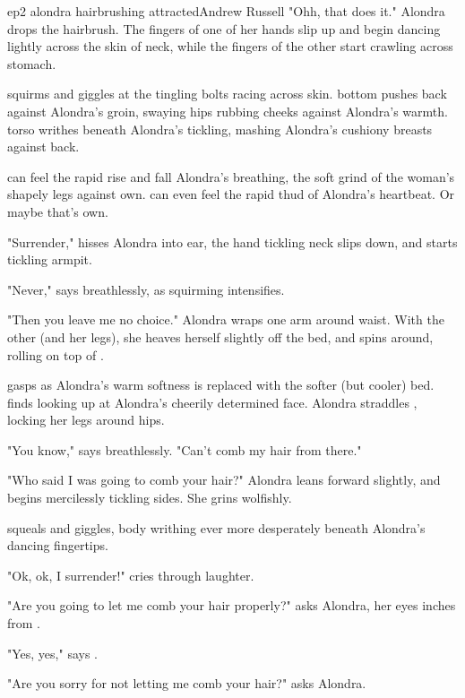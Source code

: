 \documentclass{book}
\begin{document}
\begin{childnode}{ep2 alondra hairbrushing attracted}{Andrew Russell}
    "Ohh, that does it." Alondra drops the hairbrush. The fingers of one of her hands slip up and begin dancing lightly across the skin of \names{} neck, while the fingers of the other start crawling 
    across \names{} stomach. 

    \name{} squirms and giggles at the tingling bolts racing across \hisher{} skin. \HisHer{} \muscleadj{} bottom pushes back against Alondra's groin, \hisher{} swaying hips rubbing \hisher{} 
    \bumadj{} cheeks against Alondra's warmth. \HisHer{} torso writhes beneath Alondra's tickling, mashing Alondra's cushiony breasts against \hisher{} back.

    \HeShe{} can feel the rapid rise and fall Alondra's breathing, the soft grind of the woman's shapely legs against \hisher{} own. \HeShe{} can even feel the rapid thud of Alondra's 
    heartbeat. Or maybe that's \hisher{} own. 

    "Surrender," hisses Alondra into \names{} ear, the hand tickling \names{} neck slips down, and starts tickling \hisher{} armpit.

    "Never," says \name{} breathlessly, as \hisher{} squirming intensifies.

    "Then you leave me no choice." Alondra wraps one arm around \names{} waist. With the other (and her legs), she heaves herself slightly off the bed, and spins around, rolling on top of
    \name{}.

    \name{} gasps as Alondra's warm softness is replaced with the softer (but cooler) bed. \HeShe{} finds \himselfherself{} looking up at Alondra's cheerily determined face. Alondra straddles \name{},
    locking her legs around \names{} hips. 

    "You know," says \name{} breathlessly. "Can't comb my hair from there."

    "Who said I was going to comb your hair?" Alondra leans forward slightly, and begins mercilessly tickling \names{} sides. She grins wolfishly.

    \name{} squeals and giggles, \hisher{} body writhing ever more desperately beneath Alondra's dancing fingertips.

    "Ok, ok, I surrender!" cries \name{} through \hisher{} laughter.

    "Are you going to let me comb your hair properly?" asks Alondra, her eyes inches from \names{}.

    "Yes, yes," says \name{}.

    "Are you sorry for not letting me comb your hair?" asks Alondra.


\end{childnode}
\end{document}
